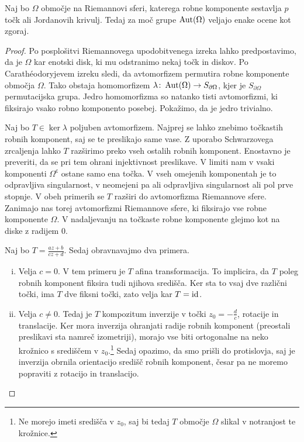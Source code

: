 \begin{izrek}
Naj bo $\Omega$ območje na Riemannovi sferi, katerega robne
komponente sestavlja $p$ točk ali Jordanovih krivulj. Tedaj za
moč grupe $\operatorname{Aut}(\Omega)$ veljajo enake ocene kot zgoraj.
\end{izrek}

\begin{proof}
Po posplošitvi Riemannovega upodobitvenega izreka lahko
predpostavimo, da je $\Omega$ kar enotski disk, ki mu odstranimo
nekaj točk in diskov. Po Carathéodoryjevem izreku
\cite[izrek~5.1.1 in opomba~5.1.2]{krantz} sledi, da avtomorfizem
permutira robne komponente območja $\Omega$. Tako obstaja
homomorfizem $\lambda \colon \operatorname{Aut}(\Omega) \to S_{\partial \Omega}$,
kjer je $S_{\partial{\Omega}}$ permutacijska grupa. Jedro
homomorfizma so natanko tisti avtomorfizmi, ki fiksirajo vsako
robno komponento posebej. Pokažimo, da je jedro trivialno.

Naj bo $T \in \ker \lambda$ poljuben avtomorfizem. Najprej se lahko
znebimo točkastih robnih komponent, saj se te preslikajo same vase.
Z uporabo Schwarzovega zrcaljenja lahko $T$ razširimo preko vseh
ostalih robnih komponent. Enostavno je preveriti, da se pri tem
ohrani injektivnost preslikave. V limiti nam v vsaki komponenti
$\Omega^\mathsf{c}$ ostane samo ena točka. V vseh omejenih
komponentah je to odpravljiva singularnost, v neomejeni pa ali
odpravljiva singularnost ali pol prve stopnje. V obeh primerih se
$T$ razširi do avtomorfizma Riemannove sfere. Zanimajo nas torej
avtomorfizmi Riemannove sfere, ki fiksirajo vse robne komponente
$\Omega$. V nadaljevanju na točkaste robne komponente glejmo kot na
diske z radijem $0$.

Naj bo $T = \frac{az + b}{cz + d}$. Sedaj obravnavajmo dva primera.

\begin{enumerate}[i)]
\item Velja $c=0$. V tem primeru je $T$ afina transformacija. To
implicira, da $T$ poleg robnih komponent fiksira tudi njihova
središča. Ker sta to vsaj dve različni točki, ima $T$ dve fiksni
točki, zato velja kar $T = \operatorname{id}$.

\item Velja $c \ne 0$. Tedaj je $T$ kompozitum inverzije v točki
$z_0 = -\frac{d}{c}$, rotacije in translacije. Ker mora inverzija
ohranjati radije robnih komponent (preostali preslikavi sta namreč
izometriji), morajo vse biti ortogonalne na neko krožnico s
središčem v $z_0$.\footnote{Ne morejo imeti središča v $z_0$, saj
bi tedaj $T$ območje $\Omega$ slikal v notranjost te krožnice.}
Sedaj opazimo, da smo prišli do protislovja, saj je inverzija
obrnila orientacijo središč robnih komponent, česar pa ne moremo
popraviti z rotacijo in translacijo.
\end{enumerate}


\end{proof}
